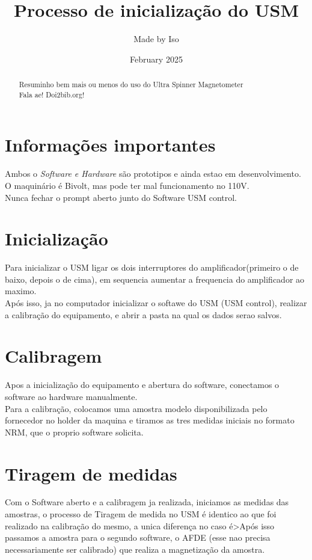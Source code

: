 \documentclass[twocolumn]{paper}
\title{Processo de inicialização do USM}
\author{Made by Iso }
\date{February 2025}
\begin{document}
\maketitle

\begin{abstract}
  Resuminho bem mais ou menos do uso do Ultra Spinner Magnetometer\\
  Fala ae!
  Doi2bib.org!
\end{abstract}

\section{Informações importantes}
Ambos o \emph{Software e Hardware} são prototipos e ainda estao em desenvolvimento.\\
O maquinário é Bivolt, mas pode ter mal funcionamento no 110V.\\
Nunca fechar o prompt aberto junto do Software USM control.\\

\section{Inicialização}
Para inicializar o USM ligar os dois interruptores do amplificador(primeiro o de baixo, depois o de cima), em sequencia aumentar a frequencia do amplificador ao maximo.\\
Após isso, ja no computador inicializar o softawe do USM (USM control), realizar a calibração do equipamento, e abrir a pasta na qual os dados serao salvos.

\section{Calibragem}
Apos a inicialização do equipamento e abertura do software, conectamos o software ao hardware manualmente.\\
Para a calibração, colocamos uma amostra modelo disponibilizada pelo fornecedor no holder da maquina e tiramos as tres medidas iniciais no formato NRM, que o proprio software solicita.

\section{Tiragem de medidas}
Com o Software aberto e a calibragem ja realizada, iniciamos as medidas das amostras, o processo de Tiragem de medida no USM é identico ao que foi realizado na calibração do mesmo, a unica diferença no caso é>Após isso passamos a amostra para o segundo software, o AFDE (esse nao precisa necessariamente ser calibrado) que realiza a magnetização da amostra.
\end{document}
